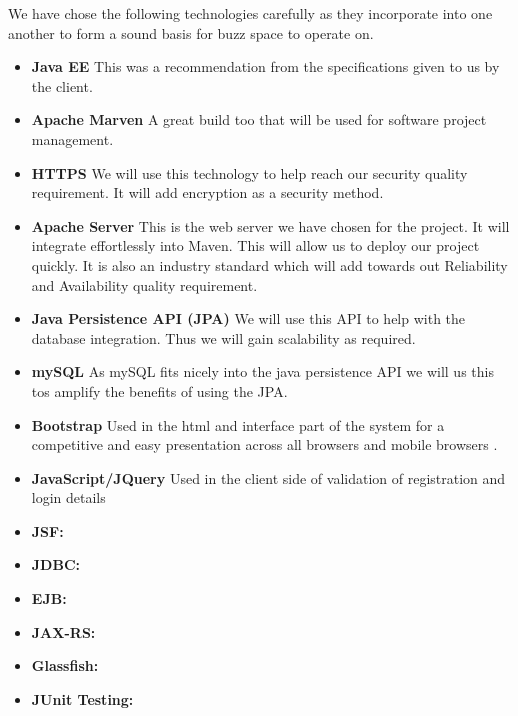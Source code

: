 We have chose the following technologies carefully as they incorporate into one another to form a sound basis for buzz space to operate on.

\begin{itemize}
	\item \textbf{Java EE}
		This was a recommendation from the specifications given to us by the client.
	\item \textbf{Apache Marven}
		A great build too that will be used for software project management.
	\item \textbf{HTTPS}
		We will use this technology to help reach our security quality requirement. It will add encryption as a security method.
	\item \textbf{Apache Server}
		This is the web server we have chosen for the project. It will integrate effortlessly into Maven. This will allow us to deploy our project quickly. It is also an industry standard which will add towards out Reliability and Availability quality requirement. 
	\item \textbf{Java Persistence API (JPA) }
		We will use this API to help with the database integration. Thus we will gain scalability as required.
	\item \textbf{mySQL}
		As mySQL fits nicely into the java persistence API we will us this tos amplify the benefits of using the JPA.
		
		\item \textbf{Bootstrap}
		Used in the html and interface part of the system for a competitive and easy presentation across all browsers 	and mobile browsers .

	\item \textbf{JavaScript/JQuery}
		Used in the client side of validation of registration and login details
		
			\item \textbf{JSF:}
			\item \textbf{JDBC:}
			\item \textbf{EJB:}
			\item \textbf{JAX-RS:}
			\item \textbf{Glassfish:}
			\item \textbf{JUnit Testing:}
		
\end{itemize}